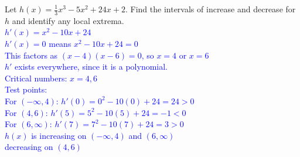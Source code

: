 \documentclass{ximera}
\begin{document}
\begin{exercise}
    Let $h(x)=\frac{1}{3}x^3-5x^2+24x+2$. Find the intervals of increase and decrease for $h$ and identify any local extrema.\\
    \textcolor{blue}{$h'(x)=x^2-10x+24$\\
    $h'(x)=0$ means $x^2-10x+24=0$\\
    This factors as $(x-4)(x-6)=0$, so $x=4$ or $x=6$\\
    $h'$ exists everywhere, since it is a polynomial.\\
    Critical numbers: $x=4,6$\\
    Test points:\\
    For $(-\infty,4)$: $h'(0)=0^2-10(0)+24=24>0$\\
    For $(4,6)$: $h'(5)=5^2-10(5)+24=-1<0$\\
    For $(6,\infty)$: $h'(7)=7^2-10(7)+24=3>0$\\
    $h(x)$ is increasing on $(-\infty,4)$ and $(6,\infty)$\\
    decreasing on $(4,6)$}
\end{exercise}
\end{document}
